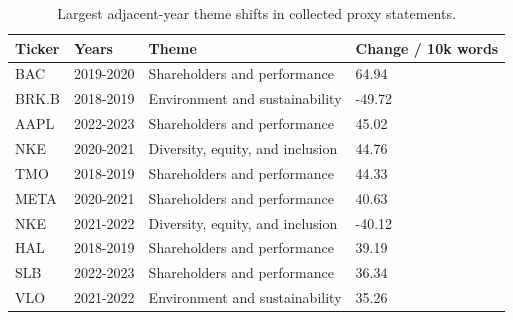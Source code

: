 \begin{table}[htbp]
\centering
\caption{Largest adjacent-year theme shifts in collected proxy statements.}
\label{tab:largest_adjacent_theme_shifts}
\begin{tabular}{llll}
\hline
Ticker & Years & Theme & Change / 10k words \\
\hline
BAC & 2019-2020 & Shareholders and performance & 64.94 \\
BRK.B & 2018-2019 & Environment and sustainability & -49.72 \\
AAPL & 2022-2023 & Shareholders and performance & 45.02 \\
NKE & 2020-2021 & Diversity, equity, and inclusion & 44.76 \\
TMO & 2018-2019 & Shareholders and performance & 44.33 \\
META & 2020-2021 & Shareholders and performance & 40.63 \\
NKE & 2021-2022 & Diversity, equity, and inclusion & -40.12 \\
HAL & 2018-2019 & Shareholders and performance & 39.19 \\
SLB & 2022-2023 & Shareholders and performance & 36.34 \\
VLO & 2021-2022 & Environment and sustainability & 35.26 \\
\hline
\end{tabular}
\end{table}
